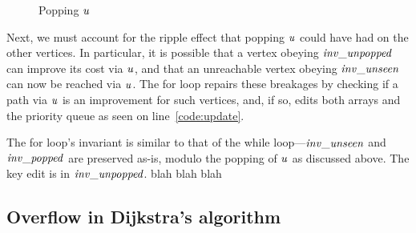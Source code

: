 {\begin{figure}[htbp]
  \caption{Popping $\mathit{u}$}
\end{figure}

Next, we must account for the ripple effect that popping
$\mathit{u}$ could have had on the other vertices.
In particular, it is possible that a vertex obeying $\mathit{inv\_unpopped}$ can
improve its cost via $\mathit{u}$, and that an unreachable vertex
obeying $\mathit{inv\_unseen}$ can now be reached via $\mathit{u}$.
The for loop repairs these breakages by
checking if a path via $\mathit{u}$ is an improvement for such vertices, and, if so,
edits both arrays and the priority queue as seen on line~\ref{code:update}.

The for loop's invariant is similar to that of the while loop---$\mathit{inv\_unseen}$
and $\mathit{inv\_popped}$ are preserved as-is, modulo the popping of
$\mathit{u}$ as discussed above. The key edit is in $\mathit{inv\_unpopped}$. blah blah blah

}

\subsection{Overflow in Dijkstra's algorithm}
\label{sec:dijkoverflow}





